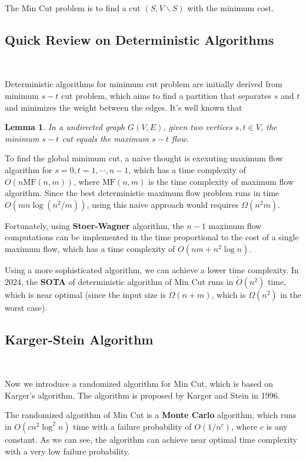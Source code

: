 \documentclass[12pt]{article}
\newtheorem{lemma}{Lemma}
\begin{document}
The Min Cut problem is to find a cut $(S,V\backslash S)$ with the minimum cost.
\subsection{Quick Review on Deterministic Algorithms}\

Deterministic algorithms for minimum cut problem are initially derived from minimum $s-t$ cut problem, which aims to find a partition that separates $s$ and $t$ and minimizes the weight between the edges. It's well known that 
\begin{lemma}
    In a undirected graph $G(V,E)$, given two vertices $s,t\in V$, the minimum $s-t$ cut equals the maximum $s-t$ flow.
\end{lemma}
To find the global minimum cut, a naive thought is exexuting maximum flow algorithm for $s=0,t=1,\cdots,n-1$, which has a time complexity of $O(n\text{MF}(n,m))$, where $\text{MF}(n,m)$ is the time complexity of maximum flow algorithm. Since the best deterministic maximum flow problem runs in time $O(mn\log(n^2/m))$, using this naive approach would requires $\Omega(n^2m)$. 

Fortunately, using \textbf{Stoer-Wagner}\cite{stoer1997simple} algorithm, the $n-1$ maximum flow computations can be implemented in the time proportional to the cost of a single maximum flow, which has a time complexity of $O(nm+n^2\log n)$. 

Using a more sophisticated algorithm, we can achieve a lower time complexity. In 2024, the \textbf{SOTA}\cite{doi:10.1137/1.9781611977912.111} of deterministic algorithm of Min Cut runs in $\tilde{O}(n^2)$ time, which is near optimal (since the input size is $\Omega(n+m)$, which is $\Omega(n^2)$ in the worst case).

\subsection{Karger-Stein Algorithm}\

Now we introduce a randomized algorithm for Min Cut, which is based on Karger's algorithm\cite{inproceedings}. The algorithm is proposed by Karger and Stein in 1996\cite{karger1996new}.

The randomized algorithm of Min Cut is a \textbf{Monte Carlo} algorithm, which runs in $O(cn^2\log^2 n)$ time with a failure probability of $O(1/n^c)$, where $c$ is any constant. As we can see, the algorithm can achieve near optimal time complexity with a very low failure probability.
\end{document}
